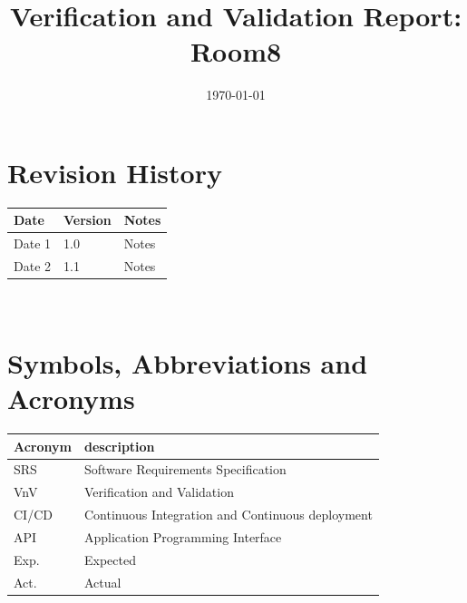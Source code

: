 \documentclass[12pt, titlepage]{article}
\begin{document}
\title{Verification and Validation Report: Room8} 
\author{\authname}
\date{\today}
	
\maketitle


\section{Revision History}

\begin{tabularx}{\textwidth}{p{3cm}p{2cm}X}
\toprule {\bf Date} & {\bf Version} & {\bf Notes}\\
\midrule
Date 1 & 1.0 & Notes\\
Date 2 & 1.1 & Notes\\
\bottomrule
\end{tabularx}

~\newpage

\section{Symbols, Abbreviations and Acronyms}

\renewcommand{\arraystretch}{1.2}
\begin{tabular}{l l} 
  \toprule		
  \textbf{Acronym} & \textbf{description}\\
  \midrule 
  SRS & Software Requirements Specification\\
  VnV & Verification and Validation\\
  CI/CD & Continuous Integration and Continuous deployment\\   
  API & Application Programming Interface\\
  Exp. & Expected\\
  Act. & Actual\\
  \bottomrule
\end{tabular}\\


\newpage

\tableofcontents

\listoftables %

\listoffigures %

\newpage
\end{document}
